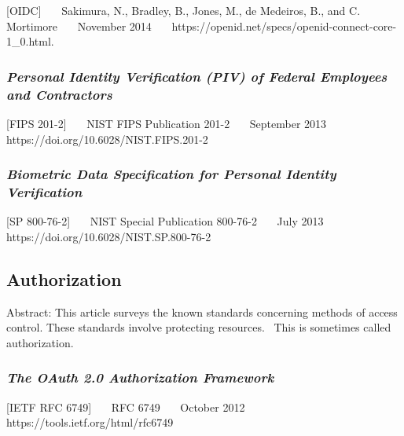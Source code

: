 {[}OIDC{]}~~~ Sakimura, N., Bradley, B., Jones, M., de Medeiros, B., and
C. Mortimore~~~ November 2014~~~
https://openid.net/specs/openid-connect-core-1\_0.html.~~~

\hypertarget{personal-identity-verification-piv-of-federal-employees-and-contractors}{%
\subsubsection{\texorpdfstring{\emph{Personal Identity Verification (PIV) of
Federal Employees and
Contractors}}{Personal Identity Verification (PIV) of Federal Employees and Contractors}}\label{personal-identity-verification-piv-of-federal-employees-and-contractors}}

{[}FIPS 201-2{]}~~~ NIST FIPS Publication 201-2~~~ September 2013~~~
https://doi.org/10.6028/NIST.FIPS.201-2~~~

\hypertarget{biometric-data-specification-for-personal-identity-verification}{%
\subsubsection{\texorpdfstring{\emph{Biometric Data Specification for
Personal Identity
Verification}}{Biometric Data Specification for Personal Identity Verification}}\label{biometric-data-specification-for-personal-identity-verification}}

{[}SP 800-76-2{]}~~~ NIST Special Publication 800-76-2~~~ July 2013~~~
https://doi.org/10.6028/NIST.SP.800-76-2~~~

\hypertarget{authorization-1}{%
\subsection{Authorization}\label{authorization-1}}

Abstract: This article surveys the known standards concerning methods of
access control. These standards involve protecting resources.~ This is
sometimes called authorization.

\hypertarget{the-oauth-2.0-authorization-framework}{%
\subsubsection{\texorpdfstring{\emph{The OAuth 2.0 Authorization
Framework}}{The OAuth 2.0 Authorization Framework}}\label{the-oauth-2.0-authorization-framework}}

{[}IETF RFC 6749{]}~~~ RFC 6749~~~ October 2012~~~
https://tools.ietf.org/html/rfc6749~~~

